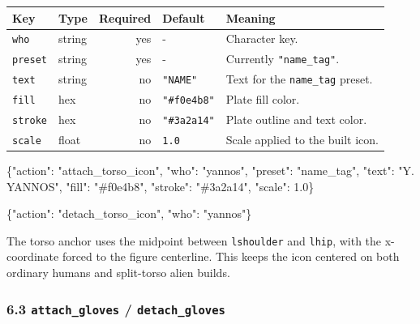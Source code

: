 \documentclass[
  12pt,
  letterpaper,
]{book}
\newenvironment{Shaded}{}{}
\newcommand{\DataTypeTok}[1]{\textcolor[rgb]{0.56,0.13,0.00}{#1}}
\newcommand{\FloatTok}[1]{\textcolor[rgb]{0.25,0.63,0.44}{#1}}
\newcommand{\FunctionTok}[1]{\textcolor[rgb]{0.02,0.16,0.49}{#1}}
\newcommand{\StringTok}[1]{\textcolor[rgb]{0.25,0.44,0.63}{#1}}
\begin{document}
\begin{longtable}[]{@{}llrll@{}}
\toprule\noalign{}
Key & Type & Required & Default & Meaning \\
\midrule\noalign{}
\endhead
\bottomrule\noalign{}
\endlastfoot
\texttt{who} & string & yes & - & Character key. \\
\texttt{preset} & string & yes & - & Currently \texttt{"name\_tag"}. \\
\texttt{text} & string & no & \texttt{"NAME"} & Text for the
\texttt{name\_tag} preset. \\
\texttt{fill} & hex & no & \texttt{"\#f0e4b8"} & Plate fill color. \\
\texttt{stroke} & hex & no & \texttt{"\#3a2a14"} & Plate outline and
text color. \\
\texttt{scale} & float & no & \texttt{1.0} & Scale applied to the built
icon. \\
\end{longtable}

\begin{Shaded}
\begin{Highlighting}[]
\FunctionTok{\{}\DataTypeTok{"action"}\FunctionTok{:} \StringTok{"attach\_torso\_icon"}\FunctionTok{,} \DataTypeTok{"who"}\FunctionTok{:} \StringTok{"yannos"}\FunctionTok{,}
 \DataTypeTok{"preset"}\FunctionTok{:} \StringTok{"name\_tag"}\FunctionTok{,} \DataTypeTok{"text"}\FunctionTok{:} \StringTok{"Y. YANNOS"}\FunctionTok{,}
 \DataTypeTok{"fill"}\FunctionTok{:} \StringTok{"\#f0e4b8"}\FunctionTok{,} \DataTypeTok{"stroke"}\FunctionTok{:} \StringTok{"\#3a2a14"}\FunctionTok{,} \DataTypeTok{"scale"}\FunctionTok{:} \FloatTok{1.0}\FunctionTok{\}}
\end{Highlighting}
\end{Shaded}

\begin{Shaded}
\begin{Highlighting}[]
\FunctionTok{\{}\DataTypeTok{"action"}\FunctionTok{:} \StringTok{"detach\_torso\_icon"}\FunctionTok{,} \DataTypeTok{"who"}\FunctionTok{:} \StringTok{"yannos"}\FunctionTok{\}}
\end{Highlighting}
\end{Shaded}

The torso anchor uses the midpoint between \texttt{lshoulder} and
\texttt{lhip}, with the x-coordinate forced to the figure centerline.
This keeps the icon centered on both ordinary humans and split-torso
alien builds.

\subsubsection{\texorpdfstring{6.3 \texttt{attach\_gloves} /
\texttt{detach\_gloves}}{6.3 attach\_gloves / detach\_gloves}}\label{attach_gloves-detach_gloves}
\end{document}
